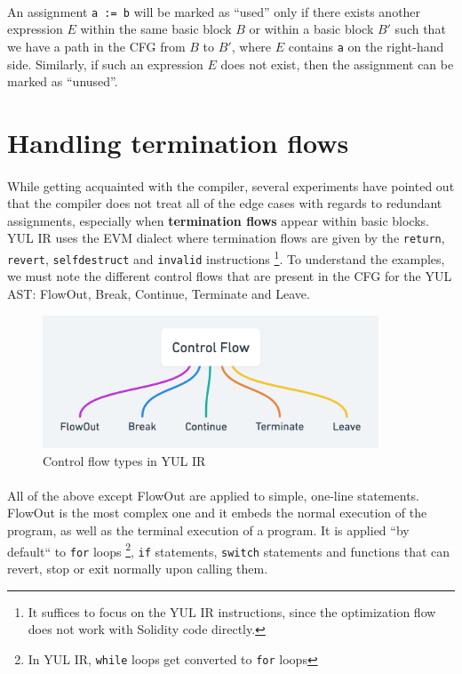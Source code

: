 \paragraph*{}
An assignment \lstinline[columns=fixed]{a := b} will be marked as ``used'' only if there exists another expression $E$ within the same basic block $B$ or within a basic block $B'$ such that we have a path in the CFG from $B$ to $B'$, where $E$ contains \lstinline[columns=fixed]{a} on the right-hand side. Similarly, if such an expression $E$ does not exist, then the assignment can be marked as ``unused''.


\section{Handling termination flows}
\paragraph*{}
While getting acquainted with the compiler, several experiments have pointed out that the compiler does not treat all of the edge cases with regards to redundant assignments, especially when \textbf{termination flows} appear within basic blocks. YUL IR uses the EVM dialect where termination flows are given by the \lstinline[columns=fixed]{return}, \lstinline[columns=fixed]{revert}, \lstinline[columns=fixed]{selfdestruct} and \lstinline[columns=fixed]{invalid} instructions \footnote{It suffices to focus on the YUL IR instructions, since the optimization flow does not work with Solidity code directly.}. To understand the examples, we must note the different control flows that are present in the CFG for the YUL AST: FlowOut, Break, Continue, Terminate and Leave.

\begin{figure}
    \centering
    \includegraphics[width=10cm]{images/cfg_control_flow_types.png}
    \caption{Control flow types in YUL IR}
    \label{fig:cfg-control-flow-types}
\end{figure}

\paragraph*{}
All of the above except FlowOut are applied to simple, one-line statements. FlowOut is the most complex one and it embeds the normal execution of the program, as well as the terminal execution of a program. It is applied ``by default`` to \lstinline[columns=fixed]{for} loops \footnote{In YUL IR, \lstinline[columns=fixed]{while} loops get converted to \lstinline[columns=fixed]{for} loops}, \lstinline[columns=fixed]{if} statements, \lstinline[columns=fixed]{switch} statements and functions that can revert, stop or exit normally upon calling them.

